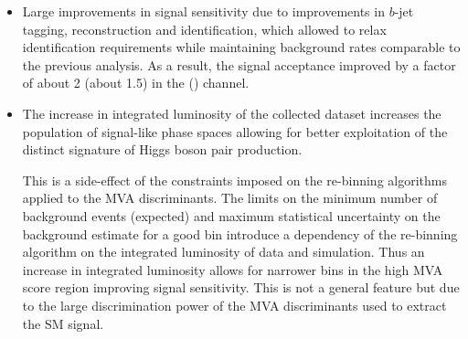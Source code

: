 \begin{itemize}

\item Large improvements in signal sensitivity due to improvements in
  $b$-jet tagging, \tauhadvis reconstruction and identification, which
  allowed to relax identification requirements while maintaining
  background rates comparable to the previous analysis. %
  As a result, the signal acceptance improved by a factor of about 2
  (about 1.5) in the \hadhad (\lephad) channel.

\item The increase in integrated luminosity of the collected dataset
  increases the population of signal-like phase spaces allowing for
  better exploitation of the distinct signature of Higgs boson pair
  production.

  This is a side-effect of the constraints imposed on the re-binning
  algorithms applied to the MVA discriminants. The limits on the
  minimum number of background events (expected) and maximum
  statistical uncertainty on the background estimate for a good bin
  introduce a dependency of the re-binning algorithm on the integrated
  luminosity of data and simulation. Thus an increase in integrated
  luminosity allows for narrower bins in the high MVA score region
  improving signal sensitivity. This is not a general feature but due
  to the large discrimination power of the MVA discriminants used to
  extract the SM \HH signal.
\end{itemize}


